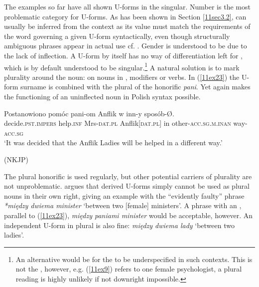 \documentclass[output=paper,colorlinks,citecolor=brown]{langscibook}
\begin{document}
\largerpage
The examples so far have all shown U-forms in the singular. Number is the most problematic category for U-forms. As has been shown in Section \ref{11sec3.2},  can usually be inferred from the context as its value must match the requirements of the word governing a given U-form syntactically, even though structurally ambiguous phrases appear in actual use cf. \citet[340--341]{szpyra-kozlowska2021}. Gender is understood to be  due to the lack of inflection. A U-form by itself has no way of differentiation left for , which is by default understood to be singular.\footnote{An alternative would be for the  to be underspecified in such contexts. This is not the , however, e.g. (\ref{11ex9}) refers to one female psychologist, a plural reading is highly unlikely if not downright impossible.} A natural solution is to mark plurality around the noun: on nouns in , modifiers or verbs. In (\ref{11ex23}) the U-form surname is combined with the plural of the honorific \emph{pani}. Yet again  makes the functioning of an uninflected noun in Polish syntax possible.

\begin{exe}
	\ex \label{11ex23}
	\gll Postanowiono pomóc pani-om Anflik w inn-y sposób-Ø. \\
	decide.\textsc{pst.impers} help.\textsc{inf} Mrs-\textsc{dat.pl} Anflik[\textsc{dat.pl}] in other-\textsc{acc.sg.m.inan} way-\textsc{acc.sg} \\
	\trans ‘It was decided that the Anflik Ladies will be helped in a different way.’
	
	\hfill (NKJP)
\end{exe}

The plural honorific is used regularly, but other potential carriers of plurality are not unproblematic. \citet[227]{lazinski2006} argues that derived U-forms simply cannot be used as plural nouns in their own right, giving an example with the ``evidently faulty'' phrase \emph{*między dwiema minister} `between two [female] ministers'. A phrase with an , parallel to (\ref{11ex23}), \emph{między paniami minister} would be acceptable, however. An independent U-form in plural is also fine: \emph{między dwiema lady} `between two ladies'.
\end{document}

